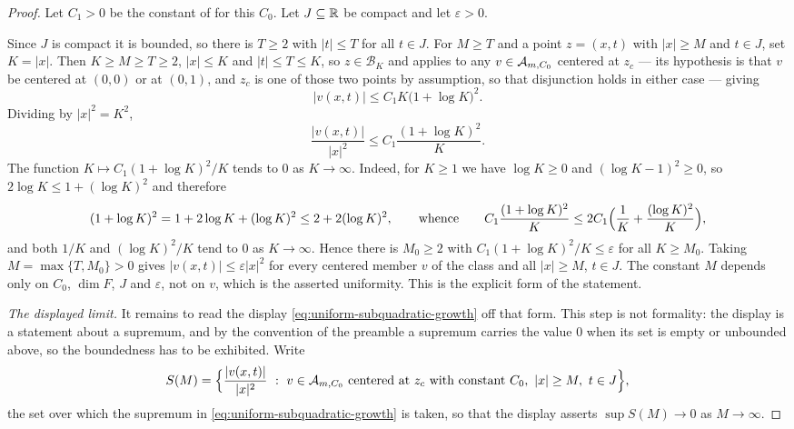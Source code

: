 \begin{proof}
Let $C_1>0$ be the constant of  for this $C_0$. Let
$J\subseteq\mathbb{R}$ be compact and let $\varepsilon>0$.

Since $J$ is compact it is bounded, so there is $T\ge2$ with $|t|\le T$ for all
$t\in J$. For $M\ge T$ and a point $z=(x,t)$ with $|x|\ge M$ and $t\in J$, set
$K=|x|$. Then $K\ge M\ge T\ge2$, $|x|\le K$ and $|t|\le T\le K$, so
$z\in\mathcal B_K$ and  applies to any
$v\in\mathcal{A}_{m,C_0}$ centered at $z_c$ — its hypothesis is that $v$ be centered
at $(0,0)$ or at $(0,1)$, and $z_c$ is one of those two points by assumption, so
that disjunction holds in either case — giving
\[
  |v(x,t)|\le C_1K\bigl(1+\log K\bigr)^2 .
\]
Dividing by $|x|^2=K^2$,
\[
  \frac{|v(x,t)|}{|x|^2}\le C_1\frac{(1+\log K)^2}{K}.
\]
The function $K\mapsto C_1(1+\log K)^2/K$ tends to $0$ as $K\to\infty$. Indeed,
for $K\ge1$ we have $\log K\ge0$ and $(\log K-1)^2\ge0$, so
$2\log K\le1+(\log K)^2$ and therefore
\[
  (1+\log K)^2=1+2\log K+(\log K)^2\le2+2(\log K)^2,
  \qquad\text{whence}\qquad
  C_1\frac{(1+\log K)^2}{K}\le2C_1\Bigl(\frac1K+\frac{(\log K)^2}{K}\Bigr),
\]
and both $1/K$ and $(\log K)^2/K$ tend to $0$ as $K\to\infty$. Hence there is
$M_0\ge2$ with
$C_1(1+\log K)^2/K\le\varepsilon$ for all $K\ge M_0$. Taking
$M=\max\{T,M_0\}>0$ gives $|v(x,t)|\le\varepsilon|x|^2$ for every centered
member $v$ of the class and all $|x|\ge M$, $t\in J$. The constant $M$ depends
only on $C_0$, $\dim F$, $J$ and $\varepsilon$, not on $v$, which is the
asserted uniformity. This is the explicit form of the statement.

\emph{The displayed limit.} It remains to read the display
\eqref{eq:uniform-subquadratic-growth} off that form. This step is not
formality: the display is a statement about a supremum, and by the convention of
the preamble a supremum carries the value $0$ when its set is empty or unbounded
above, so the boundedness has to be exhibited. Write
\[
  S(M)=\Bigl\{\frac{|v(x,t)|}{|x|^2}\ :\
      v\in\mathcal{A}_{m,C_0}\text{ centered at }z_c\text{ with constant }C_0,\
      |x|\ge M,\ t\in J\Bigr\},
\]
the set over which the supremum in \eqref{eq:uniform-subquadratic-growth} is
taken, so that the display asserts $\sup S(M)\to0$ as $M\to\infty$.


\end{proof}

